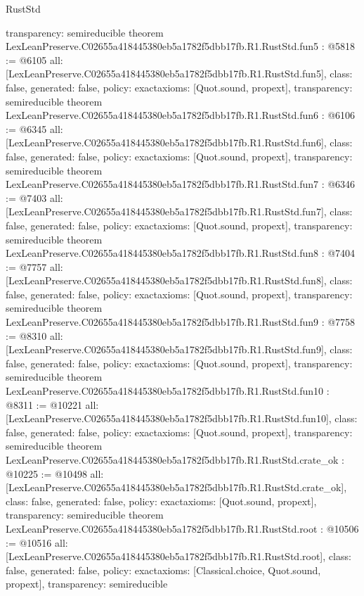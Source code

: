 \begin{lexlean}{RustStd}
\begin{coremodule}
{  transparency: semireducible
}
theorem LexLeanPreserve.C02655a418445380eb5a1782f5dbb17fb.R1.RustStd.fun5 : @5818 := @6105 {
  all: [LexLeanPreserve.C02655a418445380eb5a1782f5dbb17fb.R1.RustStd.fun5],
  class: false,
  generated: false,
  policy: exact{axioms: [Quot.sound, propext]},
  transparency: semireducible
}
theorem LexLeanPreserve.C02655a418445380eb5a1782f5dbb17fb.R1.RustStd.fun6 : @6106 := @6345 {
  all: [LexLeanPreserve.C02655a418445380eb5a1782f5dbb17fb.R1.RustStd.fun6],
  class: false,
  generated: false,
  policy: exact{axioms: [Quot.sound, propext]},
  transparency: semireducible
}
theorem LexLeanPreserve.C02655a418445380eb5a1782f5dbb17fb.R1.RustStd.fun7 : @6346 := @7403 {
  all: [LexLeanPreserve.C02655a418445380eb5a1782f5dbb17fb.R1.RustStd.fun7],
  class: false,
  generated: false,
  policy: exact{axioms: [Quot.sound, propext]},
  transparency: semireducible
}
theorem LexLeanPreserve.C02655a418445380eb5a1782f5dbb17fb.R1.RustStd.fun8 : @7404 := @7757 {
  all: [LexLeanPreserve.C02655a418445380eb5a1782f5dbb17fb.R1.RustStd.fun8],
  class: false,
  generated: false,
  policy: exact{axioms: [Quot.sound, propext]},
  transparency: semireducible
}
theorem LexLeanPreserve.C02655a418445380eb5a1782f5dbb17fb.R1.RustStd.fun9 : @7758 := @8310 {
  all: [LexLeanPreserve.C02655a418445380eb5a1782f5dbb17fb.R1.RustStd.fun9],
  class: false,
  generated: false,
  policy: exact{axioms: [Quot.sound, propext]},
  transparency: semireducible
}
theorem LexLeanPreserve.C02655a418445380eb5a1782f5dbb17fb.R1.RustStd.fun10 : @8311 := @10221 {
  all: [LexLeanPreserve.C02655a418445380eb5a1782f5dbb17fb.R1.RustStd.fun10],
  class: false,
  generated: false,
  policy: exact{axioms: [Quot.sound, propext]},
  transparency: semireducible
}
theorem LexLeanPreserve.C02655a418445380eb5a1782f5dbb17fb.R1.RustStd.crate_ok : @10225 := @10498 {
  all: [LexLeanPreserve.C02655a418445380eb5a1782f5dbb17fb.R1.RustStd.crate_ok],
  class: false,
  generated: false,
  policy: exact{axioms: [Quot.sound, propext]},
  transparency: semireducible
}
theorem LexLeanPreserve.C02655a418445380eb5a1782f5dbb17fb.R1.RustStd.root : @10506 := @10516 {
  all: [LexLeanPreserve.C02655a418445380eb5a1782f5dbb17fb.R1.RustStd.root],
  class: false,
  generated: false,
  policy: exact{axioms: [Classical.choice, Quot.sound, propext]},
  transparency: semireducible
}


\end{coremodule}
\end{lexlean}
